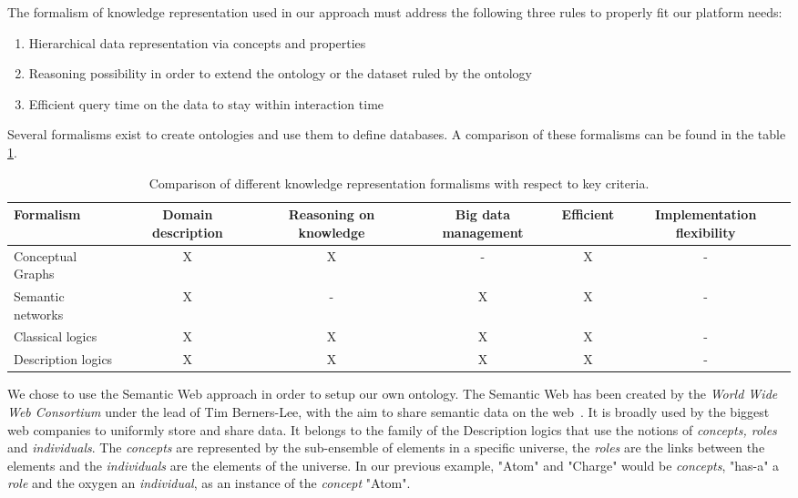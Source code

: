 \documentclass{vgtc}                          %
\begin{document}
The formalism of knowledge representation used in our approach must address the following three rules to properly fit our platform needs:

\begin{enumerate}
  \item Hierarchical data representation via concepts and properties
  \item Reasoning possibility in order to extend the ontology or the dataset ruled by the ontology
  \item Efficient query time on the data to stay within interaction time
\end{enumerate}

Several formalisms exist to create ontologies and use them to define databases. A comparison of these formalisms can be found in the table \ref{formalisms_comparison}.

\begin{table}[t]
\begin{tabular}{l|*{5}{c|}}
Formalism          & Domain description & Reasoning on knowledge & Big data management & Efficient & Implementation flexibility \\
\hline
Conceptual Graphs  & X & X & - & X & -  \\
Semantic networks  & X & - & X & X & -  \\
Classical logics   & X & X & X & X & -  \\
Description logics & X & X & X & X & -  \\
\end{tabular}
\caption{Comparison of different knowledge representation formalisms with respect to key criteria.}
  \label{formalisms_comparison}
\end{table}


We chose to use the Semantic Web approach in order to setup our own ontology. 
The Semantic Web has been created by the \textit{World Wide Web Consortium} under the lead of Tim Berners-Lee, with the aim to share semantic data on the web~\cite{berners2001semantic}. It is broadly used by the biggest web companies to uniformly store and share data. It belongs to the family of the Description logics that use the notions of \textit{concepts, roles} and \textit{individuals}. 
The \textit{concepts} are represented by the sub-ensemble of elements in a specific universe, the \textit{roles} are the links between the elements and the \textit{individuals} are the elements of the universe. In our previous example, "Atom" and "Charge" would be \textit{concepts}, "has-a" a \textit{role} and the oxygen an \textit{individual}, as an instance of the \textit{concept} "Atom".
\end{document}
